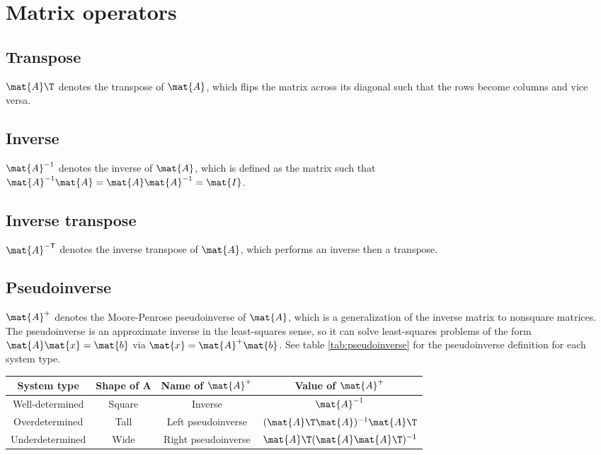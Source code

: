 \section{Matrix operators}

\subsection{Transpose}

$\mat{A}\T$ denotes the transpose of $\mat{A}$, which flips the matrix across
its diagonal such that the rows become columns and vice versa.

\subsection{Inverse}

$\mat{A}^{-1}$ denotes the inverse of $\mat{A}$, which is defined as the matrix
such that $\mat{A}^{-1}\mat{A} = \mat{A}\mat{A}^{-1} = \mat{I}$.

\subsection{Inverse transpose}

$\mat{A}^{-\mathsf{T}}$ denotes the inverse transpose of $\mat{A}$, which
performs an inverse then a transpose.

\subsection{Pseudoinverse}

$\mat{A}^+$ denotes the Moore-Penrose pseudoinverse of $\mat{A}$, which is a
generalization of the inverse matrix to nonsquare matrices. The pseudoinverse is
an approximate inverse in the least-squares sense, so it can solve least-squares
problems of the form $\mat{A}\mat{x} = \mat{b}$ via
$\mat{x} = \mat{A}^+\mat{b}$. See table \ref{tab:pseudoinverse} for
the pseudoinverse definition for each system type.
\begin{booktable}
  \begin{tabular}{|cccc|}
    \hline
    \rowcolor{headingbg}
    \textbf{System type} & \textbf{Shape of A} & \textbf{Name of }$\mat{A}^+$ &
      \textbf{Value of }$\mat{A}^+$ \\
    \hline
    Well-determined & Square & Inverse &
      $\mat{A}^{-1}$ \\
    Overdetermined & Tall & Left pseudoinverse &
      $(\mat{A}\T\mat{A})^{-1}\mat{A}\T$ \\
    Underdetermined & Wide & Right pseudoinverse &
      $\mat{A}\T(\mat{A}\mat{A}\T)^{-1}$ \\
    \hline
  \end{tabular}
  \caption{Pseudoinverse for each system type}
  \label{tab:pseudoinverse}
\end{booktable}

